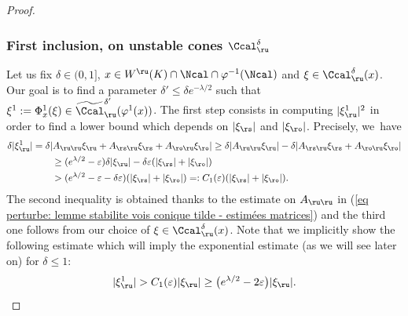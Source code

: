 \begin{proof}
\subsubsection*{First inclusion, on unstable cones $\Ccal_\ru^{\delta}$} Let us fix $\delta\in(0,1]$, $x \in W^\ru (K) \cap \Ncal \cap \varphi^{-1} (\Ncal)$ and $\xi \in \Ccal_\ru^{\delta} (x)$. Our goal is to find a parameter $\delta' \leq \delta e^{-\lambda/2} $ such that $\xi^1:= \Phi_x^1 (\xi) \in \widetilde {\Ccal}_\ru^{\delta'} (\varphi^1 (x))$. The first step consists in computing $|\xi_\ru^1|^2$ in order to find a lower bound which depends on $|\xi_\rs|$ and $|\xi_\ro|$. Precisely, we~have
\begin{equation}\label{eq: proof perturb vois conique tilde - lower bound unstable}
\begin{split}
\delta |\xi_\ru^1| &= \delta |A_{\ru\ru} \xi_\ru + A_{\rs\ru} \xi_\rs + A_{\ro\ru} \xi_\ro | \geq \delta |A_{\ru\ru} \xi_\ru| - \delta |A_{\rs\ru} \xi_\rs + A_{\ro\ru} \xi_\ro | \\
&\qquad \geq (e^{\lambda/2} -\varepsilon) \delta | \xi_\ru| - \delta \varepsilon (|\xi_\rs| + |\xi_\ro|) \\
& \qquad > (e^{\lambda/2} -\varepsilon - \delta \varepsilon) (|\xi_\rs| + |\xi_\ro|) =: C_1 (\varepsilon) (|\xi_\rs| + |\xi_\ro|).
\end{split}
\end{equation}
The second inequality is obtained thanks to the estimate on $A_{\ru\ru}$ in (\ref{eq perturbe: lemme stabilite vois conique tilde - estimées matrices}) and the third one follows from our choice of $\xi \in \Ccal_\ru^{\delta} (x)$. Note that we implicitly show the following estimate which will imply the exponential estimate (as we will see later on) for $\delta \leq 1$:
\begin{equation}\label{inequality intermediate exponential bound}
|\xi_\ru^1| > C_1 (\varepsilon) |\xi_\ru| \geq \bigl(e^{\lambda/2} -2\varepsilon \bigr) |\xi_\ru|.
\end{equation}


\end{proof}
